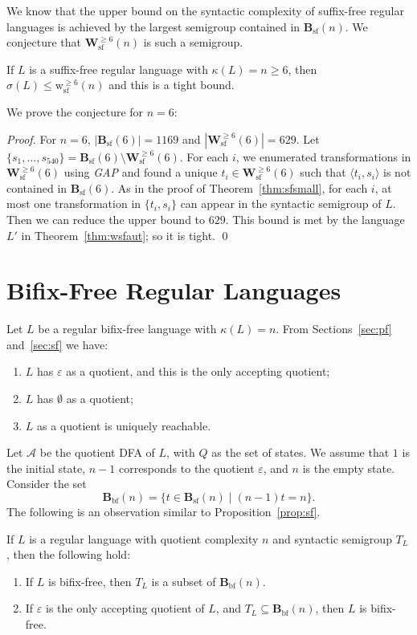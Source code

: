 \documentclass{llncs}
\renewcommand{\le}{\leqslant}
\renewcommand{\ge}{\geqslant}
\newcommand{\eps}{\varepsilon}
\newcommand{\be}{\begin{enumerate}}
\newcommand{\ee}{\end{enumerate}}
\newcommand{\cA}{{\mathcal A}}
\newcommand{\Bsf}{\mathbf{B}_{\mathrm{sf}}}
\newcommand{\Bbf}{\mathbf{B}_{\mathrm{bf}}}
\newcommand{\Wsf}{\mathbf{W}^{\ge 6}_{\mathrm{sf}}}
\newcommand{\wsf}{{\mathrm{w}^{\ge 6}_{\mathrm{sf}}}}
\begin{document}
We know that the upper bound on the  syntactic complexity of suffix-free regular languages is achieved by the largest semigroup contained in $\Bsf(n)$. We conjecture that $\Wsf(n)$ is such a semigroup. 
\medskip

\begin{conjecture}
\label{con:sf}
If $L$ is a suffix-free regular language with $\kappa(L) = n \ge 6$, then $\sigma(L) \le \wsf(n)$ and this is a tight bound. 
\end{conjecture}



We prove the conjecture for $n = 6$:

\begin{proof} 
For $n = 6$,  $|\Bsf(6)| = 1169$ and $|\Wsf(6)| = 629$. Let $\{s_1,\ldots,s_{540}\} = \Bsf(6) \setminus \Wsf(6)$. For each $i$, we enumerated transformations in $\Wsf(6)$ using \emph{GAP} and found a unique $t_i \in \Wsf(6)$ such that $\langle t_i, s_i \rangle$ is not contained in $\Bsf(6)$. As in the proof of Theorem~\ref{thm:sfsmall}, for each $i$, at most one transformation in $\{t_i,s_i\}$ can appear in the syntactic semigroup of $L$. Then we can reduce the upper bound to $629$. This bound is met by the language $L'$ in Theorem~\ref{thm:wsfaut}; so it is tight. \qed
\end{proof}



\section{Bifix-Free Regular Languages}\label{sec:bf}


Let $L$ be a regular bifix-free language with $\kappa(L) = n$. From Sections~\ref{sec:pf} and~\ref{sec:sf} we have: 
\be
\item $L$ has $\eps$ as a quotient, and this is the only accepting quotient; 
\item $L$ has $\emptyset$ as a quotient; 
\item $L$ as a quotient is uniquely reachable.
\ee

Let $\cA$ be the quotient DFA of $L$, with $Q$ as the set of states. We assume that $1$ is the initial state, $n-1$ corresponds to the quotient $\eps$, and $n$ is the empty state. Consider the set
$$\Bbf(n) = \{ t \in \Bsf(n) \mid (n-1) t = n \}.$$
The following is an observation similar to Proposition~\ref{prop:sf}.

\begin{proposition}\label{prop:bf}
If $L$ is a regular language with quotient complexity $n$ and syntactic semigroup $T_L$, then the following hold: 
\be
\item If $L$ is bifix-free, then $T_L$ is a subset of $\Bbf(n)$. 
\item If $\eps$ is the only accepting quotient of $L$, and $T_L \subseteq \Bbf(n)$, then $L$ is bifix-free.
\ee
\end{proposition}
\end{document}
